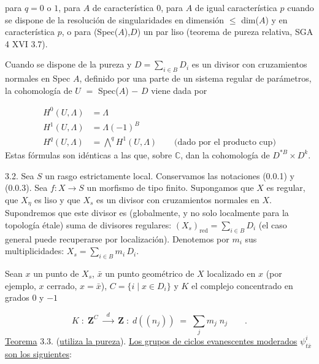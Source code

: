 para $q = 0$ o $1$, para $A$ de característica $0$, para $A$ de igual característica $p$ cuando se dispone de la resolución de singularidades en dimensión $\leqslant$ dim($A$) y en característica $p$, o para (Spec($A$),$D$) un par liso (teorema de pureza relativa, SGA 4 XVI 3.7).

Cuando se dispone de la pureza y $D = \sum\limits_{i \in B} D_{i}$ es un divisor con cruzamientos normales en Spec $A$, definido por una parte de un sistema regular de parámetros, la cohomología de $U$ $=$ Spec($A$) $-$ $D$ viene dada por



\begin{equation}\tag{3.1.2}
\begin{aligned} H^{0}(U,\Lambda) &= \Lambda \\[4pt] H^{1}(U,\Lambda) &= \Lambda(-1)^{B} \\[4pt] H^{q}(U,\Lambda) &= \overset{q}{\bigwedge} H^{1}(U,\Lambda) \qquad \text{(dado por el producto cup)} \end{aligned}
\end{equation}
Estas fórmulas son idénticas a las que, sobre $\mathbb{C}$, dan la cohomología de $D^{*B} \times D^{k}$.

3.2. Sea $S$ un rasgo estrictamente local. Conservamos las notaciones (0.0.1) y (0.0.3). Sea $f : X \longrightarrow S$ un morfismo de tipo finito. Supongamos que $X$ es regular, que $X_{\eta}$ es liso y que $X_{s}$ es un divisor con cruzamientos normales en $X$. Supondremos que este divisor es (globalmente, y no solo localmente para la topología étale) suma de divisores regulares: $(X_{s})_{\mathrm{red}} = \sum\limits_{i \in B} D_{i}$ (el caso general puede recuperarse por localización). Denotemos por $m_{i}$ sus multiplicidades: $X_{s} = \sum\limits_{i \in B} m_{i}\, D_{i}$.

Sean $x$ un punto de $X_{s}$, $\bar{x}$ un punto geométrico de $X$ localizado en $x$ (por ejemplo, $x$ cerrado, $x = \bar{x}$), $C = \{i \mid x \in D_{i}\}$ y $K$ el complejo concentrado en grados $0$ y $-1$

\begin{equation*}
K \;:\; \mathbf{Z}^{C} \;\xrightarrow{\;\;d\;\;}\; \mathbf{Z} \;:\; d((n_{j})) \;=\; \sum\limits_{j} m_{j}\; n_{j} \qquad .
\end{equation*}
\underline{Teorema} 3.3. (\underline{utiliza la pureza}). \underline{Los grupos de ciclos evanescentes moderados} $\psi^{i}_{t\bar{x}}$ \underline{son los siguientes}:


